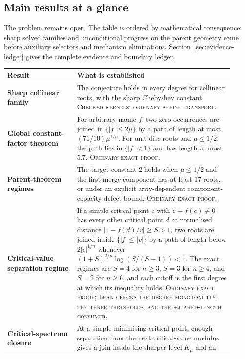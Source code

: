 \documentclass[11pt]{article}
\begin{document}
\statusboundary

\subsection*{Main results at a glance}

The problem remains open.  The table is ordered by mathematical consequence:
sharp solved families and unconditional progress on the parent geometry come
before auxiliary selectors and mechanism eliminations.
Section~\ref{sec:evidence-ledger} gives the complete evidence and boundary
ledger.

{\small
\renewcommand{\arraystretch}{1.18}
\begin{tabular}{@{}
  >{\raggedright\arraybackslash}p{0.29\linewidth}
  >{\raggedright\arraybackslash}p{0.63\linewidth}@{}}
\toprule
\textbf{Result} & \textbf{What is established} \\
\midrule
\textbf{Sharp collinear family} &
The conjecture holds in every degree for collinear roots, with the sharp
Chebyshev constant.  \textsc{Checked kernels; ordinary affine transport.} \\
\addlinespace
\textbf{Global constant-factor theorem} &
For arbitrary monic $f$, two zero occurrences are joined in
$\{|f|\le2\mu\}$ by a path of length at most
$(71/10)\mu^{1/n}$.  For unit-disc roots and $\mu\le1/2$, the path lies in
$\{|f|<1\}$ and has length at most $5.7$.
\textsc{Ordinary exact proof.} \\
\addlinespace
\textbf{Parent-theorem regimes} &
The target constant $2$ holds when $\mu\le1/2$ and the first-merge component
has at least $17$ roots, or under an explicit arity-dependent
component-capacity defect bound.  \textsc{Ordinary exact proof.} \\
\addlinespace
\textbf{Critical-value separation regime} &
If a simple critical point $c$ with $v=f(c)\ne0$ has every other critical
point $d$ at normalised distance $|1-f(d)/v|\ge S>1$, two roots are joined
inside $\{|f|\le|v|\}$ by a path of length below $2|v|^{1/n}$ whenever
$(1+S)^{2/n}\log(S/(S-1))<1$.  The exact regimes are $S=4$ for $n\ge3$,
$S=3$ for $n\ge4$, and $S=2$ for $n\ge6$, and each cutoff is the first degree
at which its inequality holds.  \textsc{Ordinary exact proof; Lean checks the
degree monotonicity, the three thresholds, and the squared-length consumer.} \\
\addlinespace
\textbf{Critical-spectrum closure} &
At a simple minimising critical point, enough separation from the next
critical-value modulus gives a join inside the sharper level $K_\mu$ and an

\end{tabular}}
\end{document}
